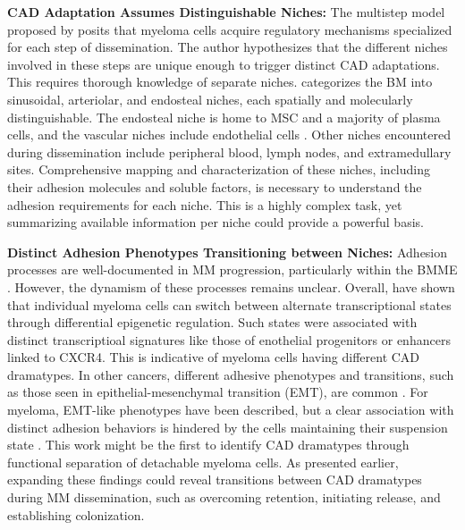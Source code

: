 \textbf{\ac{CAD} Adaptation Assumes Distinguishable Niches:} The multistep
model proposed by \citet{zeissigTumourDisseminationMultiple2020} posits that
myeloma cells acquire regulatory mechanisms specialized for each step of
dissemination. The author hypothesizes that the different niches involved in
these steps are unique enough to trigger distinct \ac{CAD} adaptations. This
requires thorough knowledge of separate niches.
\citet{granataBoneMarrowNiches2022} categorizes the \ac{BM} into sinusoidal,
arteriolar, and endosteal niches, each spatially and molecularly
distinguishable. The endosteal niche is home to \ac{MSC} and a majority of
plasma cells, and the vascular niches
 include endothelial cells
\cite{zehentmeierStaticDynamicComponents2014, wilmoreHereThereAnywhere2017}.
Other niches encountered during dissemination include peripheral blood, lymph
nodes, and extramedullary sites. Comprehensive mapping and characterization of
these niches, including their adhesion molecules and soluble factors, is
necessary to understand the adhesion requirements for each niche. This is a
highly complex task, yet summarizing available information per niche could
provide a powerful basis.


\textbf{Distinct Adhesion Phenotypes Transitioning between Niches:}
Adhesion processes are well-documented in MM progression, particularly within
the \ac{BMME} \cite{bouzerdanAdhesionMoleculesMultiple2022}. However, the
dynamism of these processes remains unclear. Overall,
\citet{fredeDynamicTranscriptionalReprogramming2021} have shown that individual
myeloma cells can switch between alternate transcriptional states through
differential epigenetic regulation. Such states were associated with distinct
transcriptioal signatures like those of enothelial progenitors or enhancers
linked to CXCR4. This is indicative of myeloma cells having different \ac{CAD}
dramatypes. In other cancers, different adhesive phenotypes and transitions,
such as those seen in epithelial-mesenchymal transition (EMT), are common
\cite{gengDynamicSwitchTwo2014}. For myeloma, EMT-like phenotypes have been
described, but a clear association with distinct adhesion behaviors is hindered
by the cells maintaining their suspension state
\cite{roccaroCXCR4RegulatesExtraMedullary2015,
    qianSETDB1InducesLenalidomide2023}. This work might be the first to identify
\ac{CAD} dramatypes through functional separation of detachable myeloma cells.
As presented earlier, expanding these findings could reveal transitions between
\ac{CAD} dramatypes during MM dissemination, such as overcoming retention,
initiating release, and establishing colonization.


